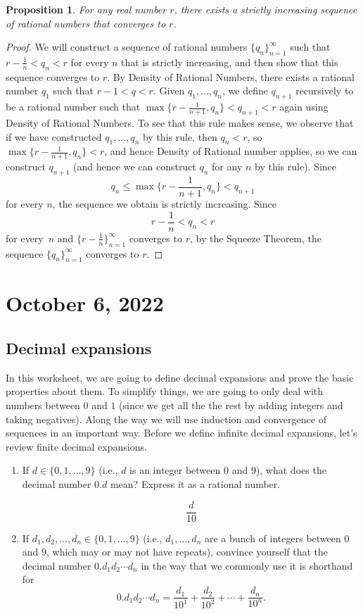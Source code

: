 \documentclass[12pt]{amsart}
\numberwithin{equation}{section}
\theoremstyle{plain} %
\newtheorem{prop}[equation]{Proposition}
\newcommand{\Oct}[1]{\section{October #1, 2022}}
\theoremstyle{definition}
\theoremstyle{remark}
\begin{document}
\begin{prop}
For any real number $r$, there exists a strictly increasing sequence of rational numbers that converges to $r$.
\end{prop}
\begin{proof}
We will construct a sequence of rational numbers $\{q_n\}_{n=1}^\infty$ such that $r-\frac{1}{n} < q_n < r$ for every $n$ that is strictly increasing, and then show that this sequence converges to $r$. By Density of Rational Numbers, there exists a rational number $q_1$ such that $r-1 < q < r$. Given $q_1,\dots,q_n$, we define $q_{n+1}$ recursively to be a rational number such that $\max\{r-\frac{1}{n+1}, q_n\} < q_{n+1} < r$ again using Density of Rational Numbers. To see that this rule makes sense, we observe that if we have constructed $q_1,\dots ,q_n$ by this rule, then  $q_n<r$, so $\max\{r-\frac{1}{n+1}, q_n\} < r$, and hence Density of Rational number applies, so we can construct $q_{n+1}$ (and hence we can construct $q_n$ for any $n$ by this rule). Since \[ q_n \leq \max\{r-\frac{1}{n+1}, q_n\} < q_{n+1}\] for every $n$, the sequence we obtain is strictly increasing. Since \[ r-\frac{1}{n}< q_{n} < r\] for every~$n$ and $\{ r - \frac{1}{n}\}_{n=1}^\infty$ converges to $r$, by the Squeeze Theorem, the sequence $\{q_n\}_{n=1}^\infty$ converges to $r$.
\end{proof}




\Oct{6}


	
	\subsection*{Decimal expansions}
	
	In this worksheet, we are going to define decimal expansions and prove the basic properties about them. To simplify things, we are going to only deal with numbers between $0$ and $1$ (since we get all the the rest by adding integers and taking negatives). Along the way we will use induction and convergence of sequences in an important way. Before we define infinite decimal expansions, let's review finite decimal expansions. 

\begin{enumerate}

\item If $d \in \{ 0,1,\dots,9\}$ (i.e., $d$ is an integer between $0$ and $9$), what does the decimal number $0.d$ mean? Express it as a rational number.

\begin{framed}
\[\frac{d}{10}\]
\end{framed}

\item  If $d_1,d_2,\dots,d_n \in \{ 0,1,\dots,9\}$ (i.e., $d_1,\dots,d_n$ are a bunch of integers between $0$ and $9$, which may or may not have repeats), convince yourself that  the decimal number $0.d_1 d_2 \cdots d_n$ in the way that we commonly use it is shorthand for
\[ 0.d_1 d_2 \cdots d_n = \frac{d_1}{10^1} + \frac{d_2}{10^2} + \cdots + \frac{d_n}{10^n}.\]

\end{enumerate}
\end{document}
